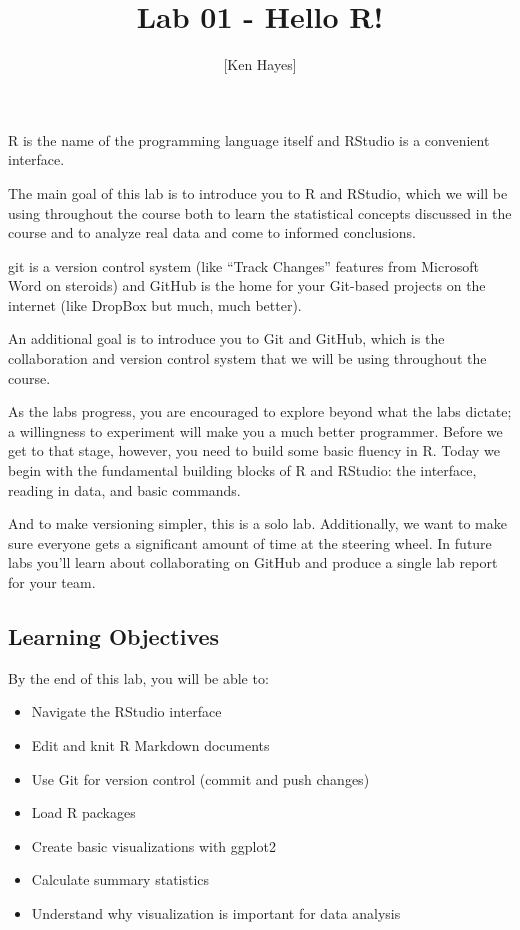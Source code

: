 \documentclass[]{tufte-handout}
\title{Lab 01 - Hello R!}
\author{{[}Ken Hayes{]}}
\date{}
\providecommand{\tightlist}{%
  \setlength{\itemsep}{0pt}\setlength{\parskip}{0pt}}
\begin{document}
\maketitle




\begin{marginfigure}
R is the name of the programming language itself and RStudio is a
convenient interface.
\end{marginfigure}

The main goal of this lab is to introduce you to R and RStudio, which we
will be using throughout the course both to learn the statistical
concepts discussed in the course and to analyze real data and come to
informed conclusions.

\begin{marginfigure}
git is a version control system (like ``Track Changes'' features from
Microsoft Word on steroids) and GitHub is the home for your Git-based
projects on the internet (like DropBox but much, much better).
\end{marginfigure}

An additional goal is to introduce you to Git and GitHub, which is the
collaboration and version control system that we will be using
throughout the course.

As the labs progress, you are encouraged to explore beyond what the labs
dictate; a willingness to experiment will make you a much better
programmer. Before we get to that stage, however, you need to build some
basic fluency in R. Today we begin with the fundamental building blocks
of R and RStudio: the interface, reading in data, and basic commands.

And to make versioning simpler, this is a solo lab. Additionally, we
want to make sure everyone gets a significant amount of time at the
steering wheel. In future labs you'll learn about collaborating on
GitHub and produce a single lab report for your team.

\subsection{Learning Objectives}\label{learning-objectives}

By the end of this lab, you will be able to:

\begin{itemize}
\tightlist
\item
  Navigate the RStudio interface
\item
  Edit and knit R Markdown documents
\item
  Use Git for version control (commit and push changes)
\item
  Load R packages
\item
  Create basic visualizations with ggplot2
\item
  Calculate summary statistics
\item
  Understand why visualization is important for data analysis
\end{itemize}
\end{document}
